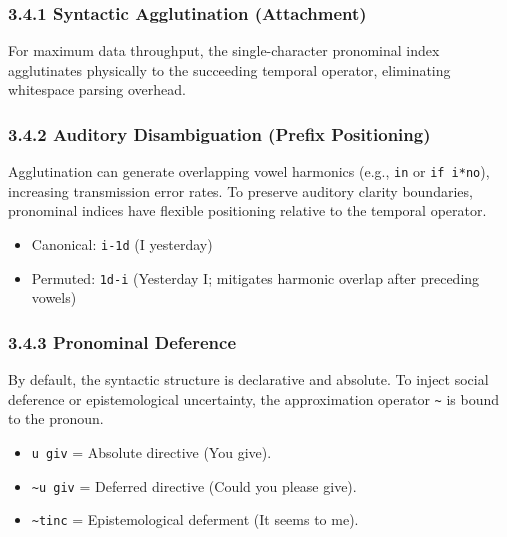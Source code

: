 \subsubsection{3.4.1 Syntactic Agglutination
(Attachment)}\label{syntactic-agglutination-attachment}

For maximum data throughput, the single-character pronominal index
agglutinates physically to the succeeding temporal operator, eliminating
whitespace parsing overhead.

\begin{Shaded}
\begin{Highlighting}[]
\end{Highlighting}
\end{Shaded}

\subsubsection{3.4.2 Auditory Disambiguation (Prefix
Positioning)}\label{auditory-disambiguation-prefix-positioning}

Agglutination can generate overlapping vowel harmonics (e.g.,
\texttt{in} or \texttt{if\ i*no}), increasing transmission error rates.
To preserve auditory clarity boundaries, pronominal indices have
flexible positioning relative to the temporal operator.

\begin{itemize}
\tightlist
\item
  Canonical: \texttt{i-1d} (I yesterday)
\item
  Permuted: \texttt{1d-i} (Yesterday I; mitigates harmonic overlap after
  preceding vowels)
\end{itemize}

\subsubsection{3.4.3 Pronominal Deference}\label{pronominal-deference}

By default, the syntactic structure is declarative and absolute. To
inject social deference or epistemological uncertainty, the
approximation operator \texttt{\textasciitilde{}} is bound to the
pronoun.

\begin{itemize}
\tightlist
\item
  \texttt{u\ giv} = Absolute directive (You give).
\item
  \texttt{\textasciitilde{}u\ giv} = Deferred directive (Could you
  please give).
\item
  \texttt{\textasciitilde{}tinc} = Epistemological deferment (It seems
  to me).
\end{itemize}

